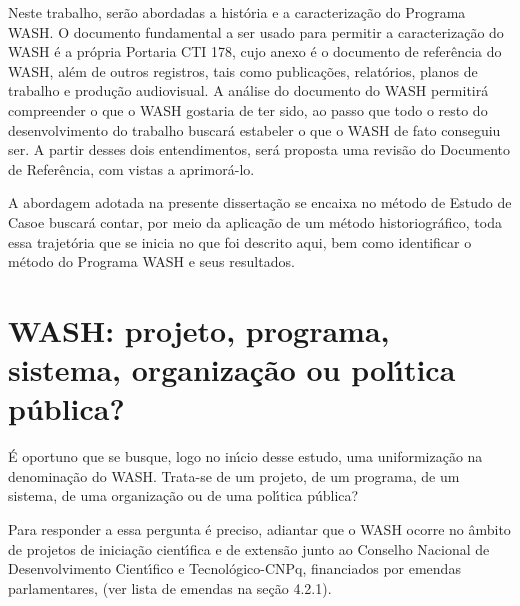 \documentclass[
12pt,		%
openright,	%
twoside,  %
a4paper,			%
chapter=TITLE,		%
english,			%
french,				%
spanish,			%
brazil				%
]{USPSC-classe/USPSC}
\begin{document}
Neste trabalho, ser\~ao abordadas a hist\'oria e a caracteriza\c{c}\~ao do Programa WASH. O documento fundamental a ser usado para permitir a caracteriza\c{c}\~ao do WASH \'e a pr\'opria Portaria CTI 178, cujo anexo \'e o documento de refer\^encia do WASH, al\'em de outros registros, tais como publica\c{c}\~oes, relat\'orios, planos de trabalho e produ\c{c}\~ao audiovisual. A an\'alise do documento do WASH permitir\'a compreender \textquotedbl o que o WASH gostaria de ter sido\textquotedbl , ao passo que todo o resto do desenvolvimento do trabalho buscar\'a estabeler \textquotedbl o que o WASH de fato conseguiu ser\textquotedbl . A partir desses dois entendimentos, ser\'a proposta uma  revis\~ao do Documento de Refer\^encia, com vistas a aprimor\'a-lo.








A abordagem adotada na presente disserta\c{c}\~ao se encaixa no m\'etodo de \textquotedbl Estudo de Caso\textquotedbl   e buscar\'a contar, por meio da aplica\c{c}\~ao de um m\'etodo historiogr\'afico, toda essa trajet\'oria que se inicia no que foi descrito aqui, bem como identificar o m\'etodo do Programa WASH e seus resultados.








\section[WASH: projeto, programa, sistema, organiza\c{c}\~ao ou pol\'{\i}tica p\'ublica?]{WASH: projeto, programa, sistema, organiza\c{c}\~ao ou pol\'{\i}tica p\'ublica?}\label{WASH: projeto, programa, sistema, organiza\c{c}\~ao ou pol\'{\i}tica p\'ublica?}
\'E oportuno que se busque, logo no in\'{\i}cio desse estudo, uma uniformiza\c{c}\~ao na denomina\c{c}\~ao do WASH. Trata-se de um projeto, de um programa, de um sistema, de uma organiza\c{c}\~ao ou de uma pol\'{\i}tica p\'ublica?








Para responder a essa pergunta \'e preciso, adiantar que o WASH ocorre no \^ambito de projetos de inicia\c{c}\~ao cient\'{\i}fica e de extens\~ao junto ao Conselho Nacional de Desenvolvimento Cient\'{\i}fico e Tecnol\'ogico-CNPq, financiados por emendas parlamentares, (ver  lista de emendas na se\c{c}\~ao 4.2.1).
\end{document}
